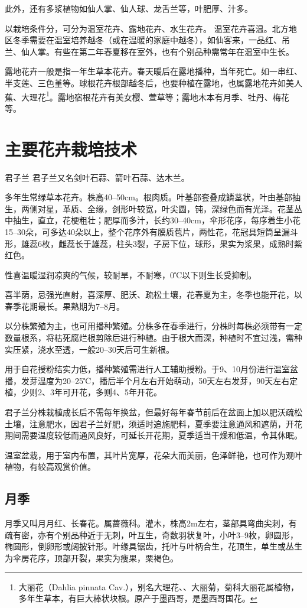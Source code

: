 \documentclass{ctexbook}
\begin{document}
此外，还有多浆植物如仙人掌、仙人球、龙舌兰等，叶肥厚、汁多。

以栽培条件分，可分为温室花卉、露地花卉、水生花卉。
温室花卉喜温。北方地区冬季需要在温室培养越冬（或在温暖的家庭中越冬），如仙客来，一品红、吊兰、仙人掌。有些在第二年春夏移在室外，也有个别品种需常年在温室中生长。

露地花卉一般是指一年生草本花卉。春天暖后在露地播种，当年死亡。如一串红、半支莲、三色堇等。球根花卉根部越冬后，也要种植在露地，也属露地花卉如美人蕉、大理花\footnote{大丽花（Dahlia pinnata Cav.），别名大理花、、大丽菊，菊科大丽花属植物，多年生草本，有巨大棒状块根。原产于墨西哥，是墨西哥国花。}。露地宿根花卉有美女樱、萱草等；露地木本有月季、牡丹、梅花等。
\section{主要花卉栽培技术}
君子兰
君子兰又名剑叶石蒜、箭叶石蒜、达木兰。

多年生常绿草本花卉。株高40--50cm。根肉质。叶基部套叠成鳞茎状，叶由基部抽生，两侧对星，革质、全缘，剑形叶较宽，叶尖圆，钝，深绿色而有光泽。花茎丛中抽生，直立，花梗粗壮；肥厚而多汁，长约30--40cm，伞形花序，每序着生小花15--30朵，可多达40朵以上，整个花序外有膜质苞片，两性花，花冠具短筒呈漏斗形，雄蕊6枚，雌蕊长于雄蕊，柱头3裂，子房下位，球形，果实为浆果，成熟时紫红色。

性喜温暖湿润凉爽的气候，较耐旱，不耐寒，0℃以下则生长受抑制。

喜半荫，忌强光直射，喜深厚、肥沃、疏松土壤，花春夏为主，冬季也能开花，以春季花期最长。果熟期为7--8月。

以分株繁殖为主，也可用播种繁殖。分株多在春季进行，分株时每株必须带有一定数量根系，将枯死腐烂根剪除后进行种植。由于根大而深，种植时不宜过浅，需种实压紧，浇水至透，一般20--30天后可生新根。

用于自花授粉结实力低，播种繁殖需进行人工辅助授粉。于9、10月份进行温室盆播，发芽温度为20--25℃，播后半个月左右开始萌动，50天左右发芽，90天左右定植，少则2、3年可开花，多则4、5年开花。

君子兰分株栽植成长后不需每年换盆，但最好每年春节前后在盆面上加以肥沃疏松土壤，注意肥水，因君子兰好肥，须适时追施肥料，夏季要注意通风和遮荫，开花期间需要温度较低而通风良好，可延长开花期，夏季适当干燥和低温，令其休眠。

温室盆栽，用于室内布置，其叶片宽厚，花朵大而美丽，色泽鲜艳，也可作为观叶植物，有较高观赏价值。
\subsection{月季}
月季又叫月月红、长春花。属蔷薇科。灌木，株高2m左右，茎部具弯曲尖刺，有疏有密，亦有个别品种近于无刺，叶互生，奇数羽状复叶，小叶3--9枚，卵圆形，椭圆形，倒卵形或阔披针形。叶缘具锯齿，托叶与叶柄合生，花顶生，单生或丛生为伞房花序，顶部开裂，果实为瘦果，栗褐色。
\end{document}
